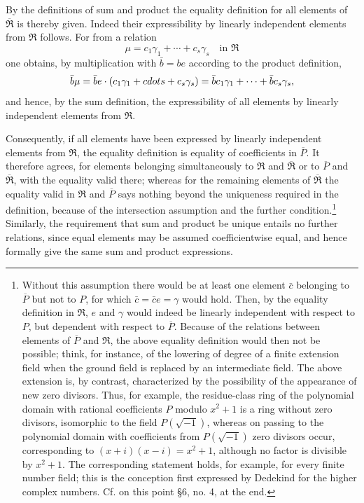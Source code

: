 \documentclass[11pt]{article}
\begin{document}
By the definitions of sum and product the equality definition for all elements of $\overline{\mathfrak R}$ is thereby given. Indeed their expressibility by linearly independent elements from $\mathfrak R$ follows. For from a relation
\[
  \mu=c_1\gamma_1+\cdots+c_s\gamma_s\quad\text{in }\mathfrak R
\]
one obtains, by multiplication with $\bar b=be$ according to the product definition,
\[
  \bar b\mu=\bar b e\cdot(c_1\gamma_1+\\cdots+c_s\gamma_s)
  =\bar b c_1\gamma_1+\cdots+\bar b c_s\gamma_s,
\]
and hence, by the sum definition, the expressibility of all elements by linearly independent elements from $\mathfrak R$.

Consequently, if all elements have been expressed by linearly independent elements from $\mathfrak R$, the equality definition is equality of coefficients in $\overline P$. It therefore agrees, for elements belonging simultaneously to $\mathfrak R$ and $\overline{\mathfrak R}$ or to $\overline P$ and $\overline{\mathfrak R}$, with the equality valid there; whereas for the remaining elements of $\overline{\mathfrak R}$ the equality valid in $\mathfrak R$ and $\overline P$ says nothing beyond the uniqueness required in the definition, because of the intersection assumption and the further condition.\footnote{Without this assumption there would be at least one element $\bar c$ belonging to $\overline P$ but not to $P$, for which $\bar c=\bar c e=\gamma$ would hold. Then, by the equality definition in $\mathfrak R$, $e$ and $\gamma$ would indeed be linearly independent with respect to $P$, but dependent with respect to $\overline P$. Because of the relations between elements of $\overline P$ and $\mathfrak R$, the above equality definition would then not be possible; think, for instance, of the lowering of degree of a finite extension field when the ground field is replaced by an intermediate field. The above extension is, by contrast, characterized by the possibility of the appearance of new zero divisors. Thus, for example, the residue-class ring of the polynomial domain with rational coefficients $P$ modulo $x^2+1$ is a ring without zero divisors, isomorphic to the field $P(\sqrt{-1})$, whereas on passing to the polynomial domain with coefficients from $P(\sqrt{-1})$ zero divisors occur, corresponding to $(x+i)(x-i)=x^2+1$, although no factor is divisible by $x^2+1$. The corresponding statement holds, for example, for every finite number field; this is the conception first expressed by Dedekind for the higher complex numbers. Cf. on this point \S 6, no. 4, at the end.} Similarly, the requirement that sum and product be unique entails no further relations, since equal elements may be assumed coefficientwise equal, and hence formally give the same sum and product expressions.
\end{document}
